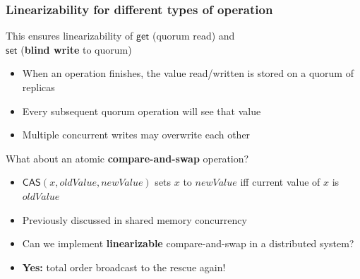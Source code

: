 \begin{frame}
\end{frame}
\label{l:non-linearizable-3}

\begin{frame}
    \label{s:cas-1}
    \frametitle{Linearizability for different types of operation}
    This ensures linearizability of $\mathsf{get}$ (quorum read) and\\$\mathsf{set}$ (\textbf{blind write} to quorum)\pause
    \begin{itemize}
        \item When an operation finishes, the value read/written is stored on a quorum of replicas
        \item Every subsequent quorum operation will see that value\pause
        \item Multiple concurrent writes may overwrite each other\\[1em]\pause
    \end{itemize}
    What about an atomic \textbf{compare-and-swap} operation?
    \begin{itemize}
        \item $\mathsf{CAS}(x, \mathit{oldValue}, \mathit{newValue})$ sets $x$ to $\mathit{newValue}$
            iff current value of $x$ is $\mathit{oldValue}$
        \item Previously discussed in shared memory concurrency\pause
        \item Can we implement \textbf{linearizable} compare-and-swap in a distributed system?\pause
        \item \textbf{Yes:} total order broadcast to the rescue again!
    \end{itemize}
\end{frame}
\label{l:cas-1}

